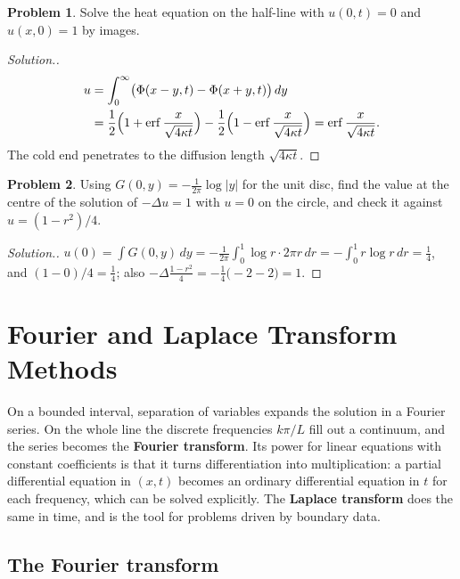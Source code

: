 \documentclass[11pt,a4paper]{article}
\numberwithin{equation}{section}
\theoremstyle{definition}
\newtheorem{problemx}{Problem}[subsection]
\newenvironment{problem}{\begin{problemx}}{\end{problemx}}
\newenvironment{solution}
  {\renewcommand{\qedsymbol}{}\begin{proof}[\textit{Solution}.]}
  {\end{proof}}
\begin{document}
\begin{problem}
Solve the heat equation on the half-line with $u(0, t) = 0$ and $u(x, 0) = 1$ by images.
\end{problem}

\begin{solution}
\begin{align*}
u &= \int_0^\infty\bigl(\Phi(x - y, t) - \Phi(x + y, t)\bigr)\,dy \\
&= \frac12\Bigl(1 + \operatorname{erf}\frac x{\sqrt{4\kappa t}}\Bigr) - \frac12\Bigl(1 - \operatorname{erf}\frac x{\sqrt{4\kappa t}}\Bigr) = \operatorname{erf}\frac x{\sqrt{4\kappa t}} .
\end{align*} The cold end penetrates to the diffusion length $\sqrt{4\kappa t}$.
\end{solution}

\begin{problem}
Using $G(0, y) = -\frac1{2\pi}\log|y|$ for the unit disc, find the value at the centre of the solution of $-\Delta u = 1$ with $u = 0$ on the circle, and check it against $u = (1 - r^2)/4$.
\end{problem}

\begin{solution}
$u(0) = \int G(0, y)\,dy = -\frac1{2\pi}\int_0^1\log r\cdot 2\pi r\,dr = -\int_0^1r\log r\,dr = \frac14$, and $(1 - 0)/4 = \frac14$; also $-\Delta\frac{1 - r^2}4 = -\frac14\bigl(-2 - 2\bigr) = 1$.
\end{solution}

\section{Fourier and Laplace Transform Methods}
\label{sec:transforms}

On a bounded interval, separation of variables expands the solution in a Fourier series. On the whole line the discrete frequencies $k\pi/L$ fill out a continuum, and the series becomes the \textbf{Fourier transform}. Its power for linear equations with constant coefficients is that it turns
differentiation into multiplication: a partial differential equation in $(x, t)$ becomes an ordinary differential equation in $t$ for each frequency, which can be solved explicitly. The \textbf{Laplace transform} does the same in time, and is the tool for problems driven by boundary data.

\subsection{The Fourier transform}
\label{ssec:fouriertransform}
\end{document}
